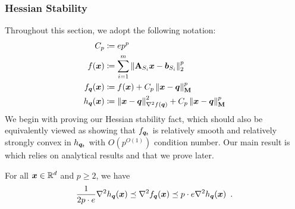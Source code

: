 \subsubsection{Hessian Stability}

Throughout this section, we adopt the following notation:
\begin{align*}
    C_p &\coloneqq ep^{p} \\
    f(\bm{x}) &\coloneqq \sum_{i=1}^m \left\lVert \mathbf{A}_{S_i}\bm{x}-\bm{b}_{S_i} \right\rVert_2^p \\
    f_{\bm{q}}(\bm{x}) &\coloneqq f(\bm{x}) + C_p\left\lVert \bm{x}-\bm{q} \right\rVert_{\mathbf{M}}^p \\
    h_{\bm{q}}(\bm{x}) &\coloneqq \left\lVert \bm{x}-\bm{q} \right\rVert_{\nabla^2 f(\bm{q})}^2 + C_p\left\lVert \bm{x}-\bm{q} \right\rVert_{\mathbf{M}}^p
\end{align*}
We begin with proving our Hessian stability fact, which should also be equivalently viewed as showing that $f_{\bm{q}_t}$ is relatively smooth and relatively strongly convex in $h_{\bm{q}_t}$ with $O(p^{O(1)})$ condition number. Our main result is  which relies on analytical results  and  that we prove later.
\begin{lemma}
\label{lemma:gp_hessian_stable}
    For all $\bm{x} \in\mathbb{R}^d$ and $p\geq 2$, we have $$\frac{1}{2p\cdot e}\nabla^2h_{\bm{q}}(\bm{x})\preceq \nabla^2f_{\bm{q}}(\bm{x}) \preceq p\cdot e\nabla^2 h_{\bm{q}}(\bm{x})\enspace.$$
\end{lemma}
